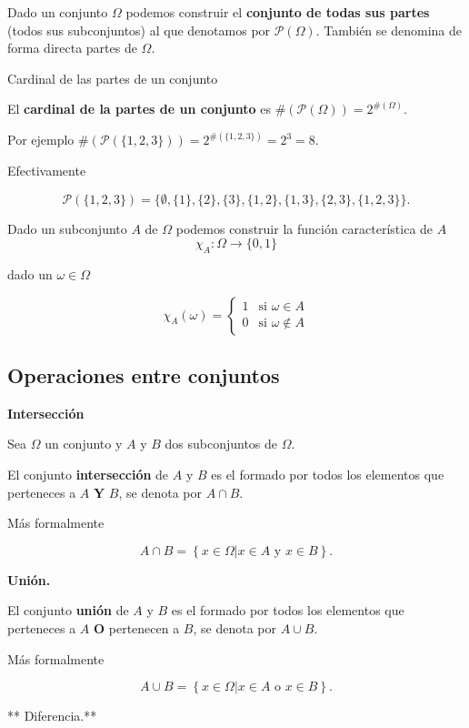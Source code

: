 \documentclass[
  letterpaper,
  DIV=11,
  numbers=noendperiod]{scrreprt}
\begin{document}
Dado un conjunto \(\Omega\) podemos construir el \textbf{conjunto de
todas sus partes} (todos sus subconjuntos) al que denotamos por
\(\mathcal{P}(\Omega)\). También se denomina de forma directa partes de
\(\Omega\).

Cardinal de las partes de un conjunto

El \textbf{cardinal de la partes de un conjunto} es
\(\#(\mathcal{P}(\Omega))=2^{\#(\Omega)}.\)

Por ejemplo
\(\#\left(\mathcal{P}(\{1,2,3\})\right)=2^{\#(\{1,2,3\})}=2^3=8.\)

Efectivamente

\[\mathcal{P}(\{1,2,3\})=\{\emptyset,\{1\},\{2\},\{3\},\{1,2\},\{1,3\},\{2,3\},\{1,2,3\}\}.\]

Dado un subconjunto \(A\) de \(\Omega\) podemos construir la función
característica de \(A\) \[\chi_A:\Omega \to \{0,1\}\]

dado un \(\omega\in \Omega\)

\[
\chi_A(\omega)=
\left\{
\begin{array}{ll}
1 &  \mbox{si }\omega \in A\\
0 &  \mbox{si }\omega \not\in A
\end{array}
\right.
\]

\subsection{Operaciones entre
conjuntos}\label{operaciones-entre-conjuntos}

\textbf{Intersección}

Sea \(\Omega\) un conjunto y \(A\) y \(B\) dos subconjuntos de
\(\Omega\).

El conjunto \textbf{intersección} de \(A\) y \(B\) es el formado por
todos los elementos que perteneces a \(A\) \textbf{Y} \(B\), se denota
por \(A\cap B\).

Más formalmente

\[
A\cap B=\left\{x\in\Omega \big| x\in A \mbox{ y } x\in B\right\}.
\]

\textbf{Unión.}

El conjunto \textbf{unión} de \(A\) y \(B\) es el formado por todos los
elementos que perteneces a \(A\) \textbf{O} pertenecen a \(B\), se
denota por \(A\cup B\).

Más formalmente

\[
A\cup B=\left\{x\in\Omega \big| x\in A \mbox{ o } x\in B\right\}.
\]

** Diferencia.**
\end{document}
